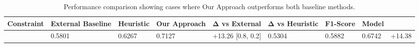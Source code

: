 \begin{table}[htbp]
\caption{Performance comparison showing cases where Our Approach outperforms both baseline methods.}
\label{tab:our_approach_wins}
\begin{tabular}{llllllll}
\toprule
Constraint & External Baseline & Heuristic & Our Approach & Δ vs External & Δ vs Heuristic & F1-Score & Model \\
\midrule
[0.5, 0.3] & 0.5801 & 0.6267 & 0.7127 & +13.26%
[0.8, 0.2] & 0.5304 & 0.5882 & 0.6742 & +14.38%
\bottomrule
\end{tabular}
\end{table}
